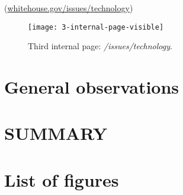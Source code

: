 \documentclass[
12pt, %
a4paper, %
oneside, %
headinclude,footinclude, %
BCOR5mm, %
]{scrartcl}
\begin{document}
	(\href{http://www.whitehouse.gov/issues/technology}{whitehouse.gov/issues/technology})

	\begin{figure}[h!]
	\centering 
	\centerline{\texttt{[image: 3-internal-page-visible]}}
	\caption[Third internal page: /issues/technology]{Third internal page: \emph{/issues/technology}.}
	\label{fig:terzapaginainterna} 
	\end{figure}

	


\section{General observations}




\section{SUMMARY}



\section{List of figures}







% 


\end{document}
